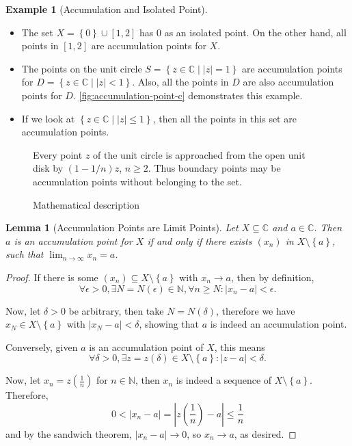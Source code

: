 \documentclass[11pt]{article}
\numberwithin{equation}{section}
\newtheorem{lemma}[theorem]{Lemma}
\theoremstyle{definition}
\newtheorem{example}[theorem]{Example}
\theoremstyle{remark}
\newcommand{\pqty}[1]{\left(#1\right)}
\newcommand{\Bqty}[1]{\left\{#1\right\}}
\newcommand{\abs}[1]{\left|#1\right|}
\newcommand{\set}[2]{\left\{#1\mid #2\right\}}
\newcommand{\ccintv}[2]{[#1,#2]}
\newcommand{\CC}{\mathbb C}
\newcommand{\NN}{\mathbb N}
\begin{document}
\begin{example}[Accumulation and Isolated Point]\label{analysis-unit-0070}
    \label{ex:fn-accumulation-isolated-point}%
    \begin{itemize}
        \item The set \(X = \Bqty{0} \cup \ccintv{1}{2}\) has \(0\) as an isolated point. On the other hand, all points in \(\ccintv{1}{2}\) are accumulation points for \(X\).
        \item The points on the unit circle \(S = \set{z \in \CC}{\abs{z} = 1}\) are accumulation points for \(D = \set{z \in \CC}{\abs{z} < 1}\). Also, all the points in \(D\) are also accumulation points for \(D\). \autoref{fig:accumulation-point-c} demonstrates this example.
        \item If we look at \(\set{z \in \CC}{\abs{z} \leq 1}\), then all the points in this set are accumulation points. 
    \end{itemize}
\end{example}

\begin{figure}[ht!]\centering\begin{minipage}{.94\linewidth}Every point \(z\) of the unit circle is approached from the open unit disk by \((1-1/n)z\), \(n\ge2\). Thus boundary points may be accumulation points without belonging to the set.\end{minipage}\caption{Mathematical description}\label{fig:accumulation-point-c}\end{figure}

\begin{lemma}[Accumulation Points are Limit Points]\label{analysis-unit-0071}
    Let \(X \subseteq \CC\) and \(a \in \CC\). Then \(a\) is an accumulation point for \(X\) if and only if there exists \(\pqty{x_n}\) in \(X \setminus \Bqty{a}\), such that \(\lim_{n \to \infty} x_n = a\).
\end{lemma}

\begin{proof}
    If there is some \(\pqty{x_n} \subseteq X \setminus \Bqty{a}\) with \(x_n \to a\), then by definition,
    \[
        \forall \epsilon > 0, \exists N = N\pqty{\epsilon} \in \NN, \forall n \geq N: \abs{x_n - a} < \epsilon.
    \]

    Now, let \(\delta > 0\) be arbitrary, then take \(N = N\pqty{\delta}\), therefore we have \(x_N \in X \setminus \Bqty{a}\) with \(\abs{x_N - a} < \delta\), showing that \(a\) is indeed an accumulation point.

    Conversely, given \(a\) is an accumulation point of \(X\), this means
    \[
        \forall \delta > 0, \exists z = z\pqty{\delta} \in X \setminus \Bqty{a}: \abs{z - a} < \delta.
    \]

    Now, let \(x_n = z\pqty{\frac{1}{n}}\) for \(n \in \NN\), then \(x_n\) is indeed a sequence of \(X \setminus \Bqty{a}\). Therefore,
    \[
        0 < \abs{x_n - a} = \abs{z\pqty{\frac{1}{n}} - a} \leq \frac{1}{n}
    \]
    and by the sandwich theorem, \(\abs{x_n - a} \to 0\), so \(x_n \to a\), as desired.
\end{proof}
\end{document}
